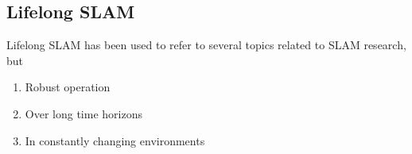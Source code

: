 \subsection{Lifelong SLAM}

Lifelong SLAM has been used to refer to several topics related to SLAM research, but 
\begin{enumerate}
    \item Robust operation
    \item Over long time horizons
    \item In constantly changing environments
\end{enumerate}